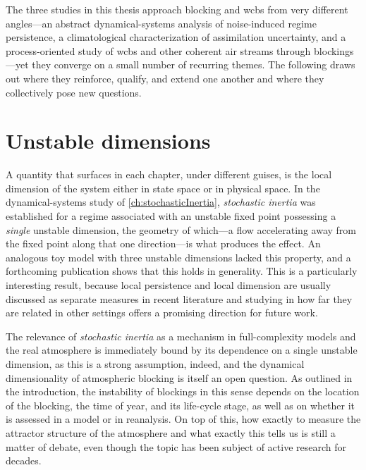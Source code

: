 
The three studies in this thesis approach blocking and \glspl{wcb}
from very different angles---an abstract dynamical-systems analysis of
noise-induced regime persistence, a climatological characterization of
assimilation uncertainty, and a process-oriented study of \glspl{wcb} and other
coherent air streams through blockings---yet they converge on a
small number of recurring themes. The following draws out where they
reinforce, qualify, and extend one another and where they collectively pose
new questions.

\section{Unstable dimensions}

A quantity that surfaces in each chapter, under different guises, is the local
dimension of the system either in state space or in physical space.
In the dynamical-systems
study of \cref{ch:stochasticInertia}, \emph{stochastic inertia}
was established
for a regime associated with
an unstable fixed point possessing a \emph{single} unstable dimension, the
geometry of which---a flow accelerating away from the fixed point along that
one direction---is what produces the effect. An analogous toy model with
three unstable dimensions lacked this property, and a forthcoming publication
shows that this holds in generality. This is a particularly interesting result,
because local persistence and local dimension are usually discussed as separate
measures in recent literature and studying in how far they are related
in other settings offers a promising direction for future work.

The relevance of \emph{stochastic inertia} as a mechanism in full-complexity
models and the real atmosphere is
immediately bound by its dependence on a single unstable dimension, as this
is a strong assumption, indeed, and the dynamical dimensionality of atmospheric
blocking
is itself an open question. As outlined in the introduction, the
instability of blockings in this sense depends on the location of the
blocking, the time of year, and its life-cycle stage, as well as on whether it
is assessed in a model or in reanalysis. On top of this, how exactly to measure
the attractor structure of the atmosphere and what exactly this tells us is
still a matter of debate, even though the topic has been subject of active
research for decades.

